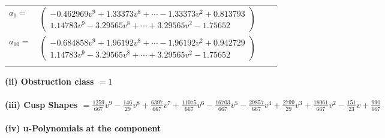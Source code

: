 \documentclass[1p]{elsarticle_modified}
\theoremstyle{definition}
\begin{document}
\begin{tabular}{m{7pt} m{180pt} m{7pt} m{180pt} }
\flushright $a_{1}=$&$\begin{pmatrix}-0.462969 v^{9}+1.33373 v^{8}+\cdots-1.33373 v^{2}+0.813793\\1.14783 v^{9}-3.29565 v^{8}+\cdots+3.29565 v^{2}-1.75652\end{pmatrix}$ \\
\flushright $a_{10}=$&$\begin{pmatrix}-0.684858 v^{9}+1.96192 v^{8}+\cdots-1.96192 v^{2}+0.942729\\1.14783 v^{9}-3.29565 v^{8}+\cdots+3.29565 v^{2}-1.75652\end{pmatrix}$\\&\end{tabular}
\flushleft \textbf{(ii) Obstruction class $= 1$}\\~\\
\flushleft \textbf{(iii) Cusp Shapes $= \frac{1259}{667} v^9-\frac{146}{29} v^8+\frac{6397}{667} v^7+\frac{11075}{667} v^6-\frac{16703}{667} v^5-\frac{29857}{667} v^4+\frac{2799}{29} v^3+\frac{18061}{667} v^2-\frac{151}{23} v+\frac{990}{667}$}\\~\\
\newpage\renewcommand{\arraystretch}{1}
\flushleft \textbf{(iv) u-Polynomials at the component}\newline \\
\end{document}
